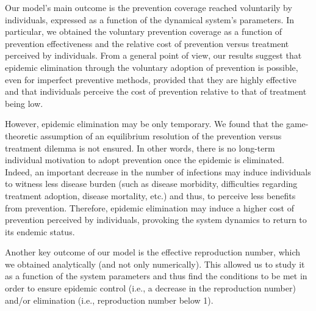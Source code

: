 Our model's main outcome is the prevention coverage reached voluntarily by individuals, expressed as a function of the dynamical system's parameters. In particular, we obtained the voluntary prevention coverage as a function of prevention effectiveness and the relative cost of prevention versus treatment perceived by individuals. From a general point of view, our results suggest that epidemic elimination through the voluntary adoption of prevention is possible, even for imperfect preventive methods, provided that they are highly effective and that individuals perceive the cost of prevention relative to that of treatment being low. 

However, epidemic elimination may be only temporary. We found that the game-theoretic assumption of an equilibrium resolution of the prevention versus treatment dilemma is not ensured. In other words, there is no long-term individual motivation to adopt prevention once the epidemic is eliminated. Indeed, an important decrease in the number of infections may induce individuals to witness less disease burden (such as disease morbidity, difficulties regarding treatment adoption, disease mortality, etc.) and thus, to perceive less benefits from prevention. Therefore, epidemic elimination may induce a higher cost of prevention perceived by individuals, provoking the system dynamics to return to its endemic status.

%

Another key outcome of our model is the effective reproduction number, which we obtained analytically (and not only numerically). This allowed us to study it as a function of the system parameters and thus find the conditions to be met in order to ensure epidemic control (i.e., a decrease in the reproduction number) and/or elimination (i.e., reproduction number below 1). 


